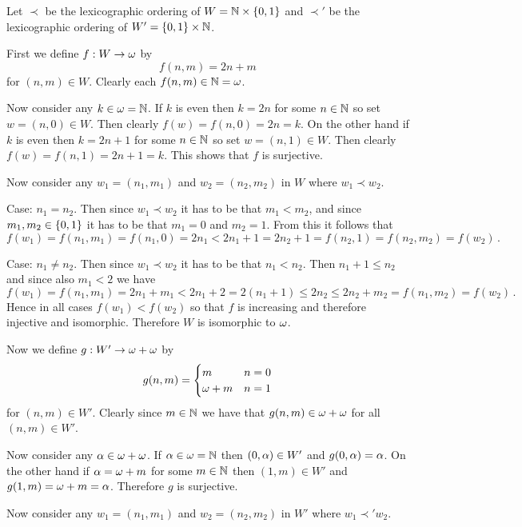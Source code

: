 \begin{solution}
	Let $\prec$ be the lexicographic ordering of $W = \mathbb{N} \times \left\{ 0,1 \right\}$ and $\prec'$ be the lexicographic ordering of $W' = \left\{ 0,1 \right\} \times \mathbb{N}$.

    First we define $f : W \to \omega$ by
    $$
    f(n,m) = 2n + m
    $$
    for $(n, m) \in W$.
    Clearly each $f(n,m) \in \mathbb{N} = \omega$.

    Now consider any $k \in \omega = \mathbb{N}$.
    If $k$ is even then $k = 2n$ for some $n \in \mathbb{N}$ so set $w = (n, 0) \in W$.
    Then clearly $f(w) = f(n,0) = 2n = k$.
    On the other hand if $k$ is even then $k = 2n + 1$ for some $n \in \mathbb{N}$ so set $w = (n,1) \in W$.
    Then clearly $f(w) = f(n,1) = 2n+1 = k$.
    This shows that $f$ is surjective.

    Now consider any $w_1 = (n_1,m_1)$ and $w_2 = (n_2, m_2)$ in $W$ where $w_1 \prec w_2$.

    Case: $n_1 = n_2$.
    Then since $w_1 \prec w_2$ it has to be that $m_1 < m_2$, and since $m_1,m_2 \in \left\{ 0,1 \right\}$ it has to be that $m_1=0$ and $m_2 = 1$.
    From this it follows that
    $$
    f(w_1) = f(n_1,m_1) = f(n_1,0) = 2n_1 < 2n_1 + 1 = 2n_2 + 1 = f(n_2,1) = f(n_2,m_2) = f(w_2) \,.
    $$

    Case: $n_1 \neq n_2$.
    Then since $w_1 \prec w_2$ it has to be that $n_1 < n_2$.
    Then $n_1 + 1 \leq n_2$ and since also $m_1 < 2$ we have
    $$
    f(w_1) = f(n_1, m_1) = 2n_1 + m_1 < 2n_1 + 2 = 2(n_1 + 1) \leq 2n_2 \leq 2n_2 + m_2 = f(n_1, m_2) = f(w_2) \,.
    $$
    Hence in all cases $f(w_1) < f(w_2)$ so that $f$ is increasing and therefore injective and isomorphic.
    Therefore $W$ is isomorphic to $\omega$.

    Now we define $g: W' \to \omega+\omega$ by
    $$
    g(n,m) = \begin{cases}
    	m & n = 0 \\
        \omega + m & n = 1
    \end{cases}
    $$
    for $(n,m) \in W'$.
    Clearly since $m \in \mathbb{N}$ we have that $g(n,m) \in \omega+\omega$ for all $(n,m) \in W'$.

    Now consider any $\alpha \in \omega + \omega$.
    If $\alpha \in \omega = \mathbb{N}$ then $(0, \alpha) \in W'$ and $g(0,\alpha) = \alpha$.
    On the other hand if $\alpha = \omega + m$ for some $m \in \mathbb{N}$ then $(1, m) \in W'$ and $g(1,m) = \omega + m = \alpha$.
    Therefore $g$ is surjective.

    Now consider any $w_1 = (n_1,m_1)$ and $w_2 = (n_2, m_2)$ in $W'$ where $w_1 \prec' w_2$.


\end{solution}
